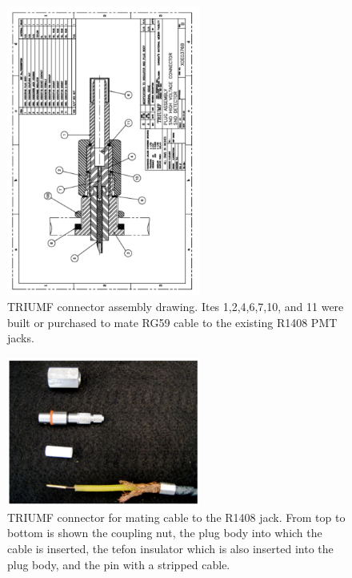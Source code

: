 \documentclass[preprint,12pt]{elsarticle}
\begin{document}
\begin{figure}[h]
\begin{center}
\includegraphics[width=2.5in,angle=270]{graphics/connectordrawing.pdf}
\caption{TRIUMF connector assembly drawing.  Ites 1,2,4,6,7,10, and 11 were built or purchased to mate RG59 cable to the existing R1408 PMT jacks.
\label{fig:connectordrawing}}
\end{center}
\end{figure}

\begin{figure}[h]
\begin{center}
\includegraphics[width=2.5in]{graphics/connectorpic.pdf}
\caption{TRIUMF connector for mating cable to the R1408 jack.  From top to bottom is shown the coupling nut, the plug body into which the cable is inserted, the tefon insulator which is also inserted into the plug body, and the pin with a stripped cable.
\label{fig:connectorpic}}
\end{center}
\end{figure}

\end{document}

